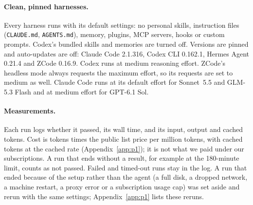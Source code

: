 \paragraph{Clean, pinned harnesses.}
Every harness runs with its default settings: no personal skills, instruction files (\texttt{CLAUDE.md},
\texttt{AGENTS.md}), memory, plugins, MCP servers, hooks or custom prompts. Codex's bundled skills and memories
are turned off. Versions are pinned and auto-updates are off: Claude Code 2.1.316, Codex CLI 0.162.1, Hermes
Agent 0.21.4 and ZCode 0.16.9. Codex runs at medium reasoning effort. ZCode's headless mode always requests the
maximum effort, so its requests are set to medium as well.
Claude Code runs at its default effort for Sonnet~5.5 and GLM-5.3 Flash and at medium effort for GPT-6.1 Sol.

\paragraph{Measurements.}
Each run logs whether it passed, its wall time, and its input, output and cached tokens. Cost is tokens times
the public list price per million tokens, with cached tokens at the cached rate
(Appendix~\ref{app:p1}); it is not what we paid under our subscriptions. A run that ends without a result,
for example at the 180-minute limit, counts as not passed. Failed and timed-out runs stay in the log. A run that
ended because of the setup rather than the agent (a full disk, a dropped network, a machine restart, a proxy
error or a subscription usage cap) was set aside and rerun with the same settings; Appendix~\ref{app:p1} lists
these reruns.

